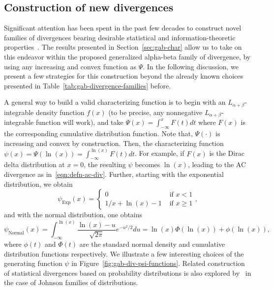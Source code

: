 \documentclass[11pt]{article}
\theoremstyle{plain}
\theoremstyle{remark}
\newcommand{\todo}[1]{\textcolor{red}{#1}}
\begin{document}

\subsection{Construction of new divergences}\label{sec:gab-construct}

Significant attention has been spent in the past few decades to construct novel families of divergences bearing desirable statistical and information-theoretic properties~\citep{kuus2008extensions, osterreicher2003new}. The results presented in Section~\ref{sec:gab-char} allow us to take on this endeavor within the proposed generalized alpha-beta family of divergence, by using any increasing and convex function as $\Psi$. In the following discussion, we present a few strategies for this construction beyond the already known choices presented in Table~\ref{tab:gab-divergence-families} before.

A general way to build a valid characterizing function is to begin with an $L_{\alpha+\beta}$-integrable density function $f(x)$ (to be precise, any nonnegative $L_{\alpha+\beta}$-integrable function will work), and take $\Psi(x) = \int_{-\infty}^x F(t)dt$ where $F(x)$ is the corresponding cumulative distribution function. Note that, $\Psi(\cdot)$ is increasing and convex by construction. Then, the characterizing function $\psi(x) = \Psi(\ln(x)) = \int_{-\infty}^{\ln(x)} F(t)dt$. For example, if $F(x)$ is the Dirac delta distribution at $x = 0$, the resulting $\psi$ becomes $\ln(x)$, leading to the AC divergence as in~\eqref{eqn:defn-ac-div}. Further, starting with the exponential distribution, we obtain
\begin{equation*}
    \psi_{\text{Exp}}(x)
    = \begin{cases}
        0                & \text{ if } x < 1    \\
        1/x + \ln(x) - 1 & \text{ if } x \geq 1
    \end{cases},
\end{equation*}
\noindent and with the normal distribution, one obtains
\begin{equation}
    \psi_{\text{Normal}}(x)
    = \int_{-\infty}^{\ln(x)} \frac{\ln(x) - u}{\sqrt{2\pi}} e^{-u^2/2}du
    = \ln(x) \Phi(\ln(x)) + \phi(\ln(x)),
    \label{eqn:psi-normal-func}
\end{equation}
\noindent where $\phi(t)$ and $\Phi(t)$ are the standard normal density and cumulative distribution functions respectively. We illustrate a few interesting choices of the generating function $\psi$ in Figure~\ref{fig:gab-div-psi-functions}. Related construction of statistical divergences based on probability distributions is also explored by~\cite{fabian2003core} in the case of Johnson families of distributions.
\end{document}
